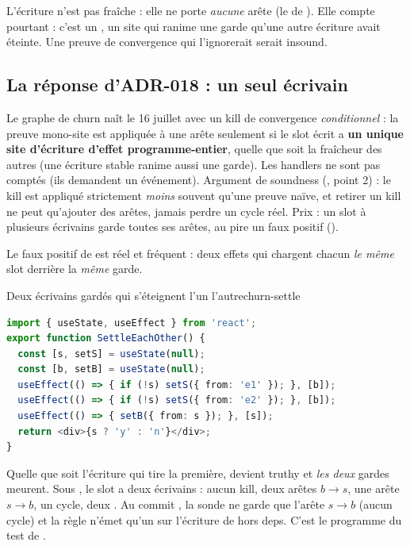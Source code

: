 L'écriture  n'est pas fraîche : elle ne porte \emph{aucune} arête (le
 de ). Elle compte pourtant : c'est un
, un site qui ranime une garde qu'une autre écriture avait éteinte. Une
preuve de convergence qui l'ignorerait serait insound.

\subsection{La réponse d'ADR-018 : un seul écrivain}

\begin{decision}[ADR-18]
Le graphe de churn naît le 16 juillet avec un kill de convergence \emph{conditionnel} : la
preuve mono-site est appliquée à une arête seulement si le slot écrit a \textbf{un unique
site d'écriture d'effet programme-entier}, quelle que soit la fraîcheur des autres (une
écriture stable ranime aussi une garde). Les handlers ne sont pas comptés (ils demandent un
événement). Argument de soundness (, point 2) : le kill est appliqué strictement
\emph{moins} souvent qu'une preuve naïve, et retirer un kill ne peut qu'ajouter des
arêtes, jamais perdre un cycle réel. Prix : un slot à plusieurs écrivains garde toutes ses
arêtes, au pire un \Warning{} faux positif ().
\end{decision}

Le faux positif de  est réel et fréquent : deux effets qui chargent chacun
\emph{le même} slot derrière la \emph{même} garde.

\begin{exemple}{Deux écrivains gardés qui s'éteignent l'un l'autre}{churn-settle}
\begin{lstlisting}[language=TypeScript,caption={\file{/tmp/ch15/settle_each_other.tsx}},label={lst:churn-settle}]
import { useState, useEffect } from 'react';
export function SettleEachOther() {
  const [s, setS] = useState(null);
  const [b, setB] = useState(null);
  useEffect(() => { if (!s) setS({ from: 'e1' }); }, [b]);
  useEffect(() => { if (!s) setS({ from: 'e2' }); }, [b]);
  useEffect(() => { setB({ from: s }); }, [s]);
  return <div>{s ? 'y' : 'n'}</div>;
}
\end{lstlisting}
Quelle que soit l'écriture qui tire la première,  devient truthy et \emph{les deux}
gardes meurent. Sous , le slot  a deux écrivains : aucun kill, deux
arêtes  $b \to s$, une arête  $s \to b$, un cycle, deux \Warning.
Au commit \snapshotCommit, la sonde ne garde que l'arête $s \to b$ (aucun cycle) et la
règle n'émet qu'un \Info{} sur l'écriture de  hors deps. C'est le programme du test
\allowbreak{}
de .
\end{exemple}


